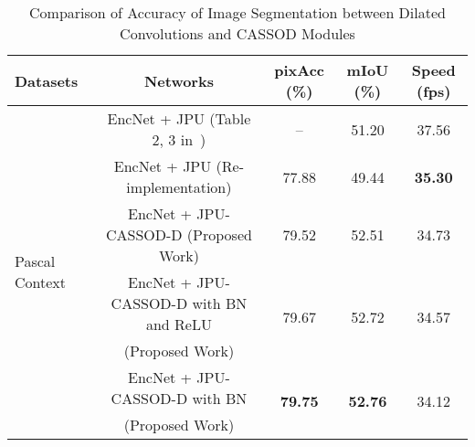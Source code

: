 \documentclass[10pt,twocolumn,letterpaper]{article}
\begin{document}
\begin{table*}
\caption{Comparison of Accuracy of Image Segmentation \cite{Wu19} between Dilated Convolutions and CASSOD Modules}
\begin{center}
\begin{tabular}{l|c|ccc}
\hline
Datasets                                          &  Networks                                                & pixAcc (\%)                     & mIoU (\%)                           & Speed (fps)   \\
\hline                                                                                                                                                                                
\multirow{7}{*}{Pascal Context~\cite{Mottaghi14}} &  EncNet + JPU (Table 2, 3 in~\cite{Wu19})                &                         --      &                         51.20               & 37.56 \\
\cline{2-5}
                                                  &  EncNet + JPU (Re-implementation)                        &                         77.88   &                         49.44               & \textbf{35.30} \\
                                                  &  EncNet + JPU-CASSOD-D (Proposed Work)                   &                         79.52   &                         52.51               & 34.73 \\
                                                  &  EncNet + JPU-CASSOD-D with BN and ReLU                  &         \multirow{2}{*}{79.67}  &         \multirow{2}{*}{52.72}              & \multirow{2}{*}{34.57}\\
                                                  & (Proposed Work)                                          &                                 &                                             &  \\
                                                  &  EncNet + JPU-CASSOD-D with BN                           & \multirow{2}{*}{\textbf{79.75}} & \multirow{2}{*}{\textbf{52.76}}             & \multirow{2}{*}{34.12} \\
                                                  & (Proposed Work)                                          &                                 &                                             &\\                                                                       
\hline                                                                                                                                                                               

\end{tabular}
\end{center}
\end{table*}
\end{document}
